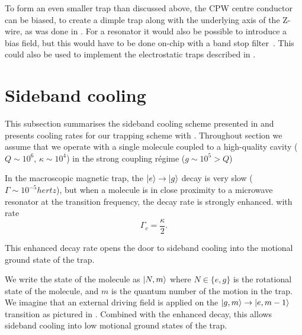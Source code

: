 To form an even smaller trap than discussed above, the CPW centre conductor can
be biased, to create a dimple trap along with the underlying axis of the
Z-wire, as was done in . For a resonator it would also
be possible to introduce a bias field, but this would have to be done on-chip
with a band stop filter~\cite{doi:10.1063/1.4808364}. This could also be used
to implement the electrostatic traps described in .




\section{Sideband cooling}


This subsection summarises the sideband cooling scheme presented in
 and presents cooling rates for our trapping scheme with
\CaF{}.  Throughout section we assume that we operate with a single molecule
coupled to a high-quality cavity ($Q\sim10^6$, $\kappa \sim 10^4$) in the
strong coupling r\'egime ($g\sim10^5>Q$)

In the macroscopic magnetic trap, the
$\ket{e}\rightarrow\ket{g}$ decay is very slow ($\Gamma \sim
10^{-5}\si{hertz}$), but when a molecule is in close proximity to a microwave
resonator at the transition frequency, the decay rate is strongly enhanced. 
with rate
%
\begin{equation}
  \Gamma_c = \frac{\kappa}{2}.
\end{equation}

This enhanced decay rate opens the door to sideband cooling into the motional
ground state of the trap.

We write the state of the molecule as $\ket{N, m}$ where $N\in\{e,g\}$ is the
rotational state of the molecule, and $m$ is the quantum number of the motion
in the trap. We imagine that an external driving field is applied on the
$\ket{g, m} \rightarrow \ket{e, m-1}$ transition as pictured in
. Combined with the enhanced decay, this allows
sideband cooling into low motional ground states of the trap.

